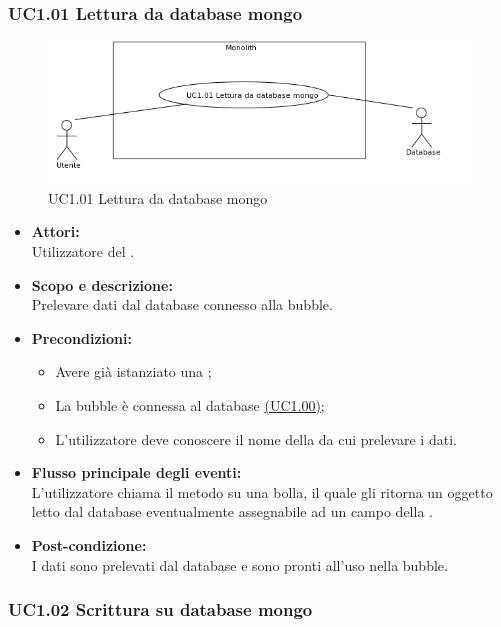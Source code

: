 \subsubsection{UC1.01 Lettura da database mongo} \label{UC1.01}

\begin{figure}[H]
	\centering
	\includegraphics[width=15cm]{../../documenti/AnalisiDeiRequisiti/Diagrammi_img/uc1_01.png}
	\caption{UC1.01 Lettura da database mongo}
\end{figure}

\begin{itemize}
	\item \textbf{Attori:}
	\\Utilizzatore del .
	\item \textbf{Scopo e descrizione:} 
	\\Prelevare dati dal database connesso alla bubble.
	\item \textbf{Precondizioni:}
	\begin{itemize}
		\item Avere già istanziato una ;
		\item La bubble è connessa al database  \hyperref[UC1.00]{(UC1.00)};
		\item L’utilizzatore deve conoscere il nome della  da cui prelevare i dati.
	\end{itemize}
	\item \textbf{Flusso principale degli eventi:}
	\\L’utilizzatore chiama il metodo su una bolla, il quale gli ritorna un oggetto  letto dal database eventualmente assegnabile ad un campo della .
	\item \textbf{Post-condizione:}
	\\I dati sono prelevati dal database e sono pronti all’uso nella bubble.
\end{itemize}

\subsubsection{UC1.02 Scrittura su database mongo} \label{UC1.02}

